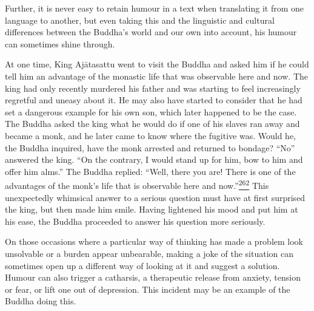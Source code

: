 Further, it is never easy to retain humour in a text when translating it
from one language to another, but even taking this and the linguistic
and cultural differences between the Buddha's world and our own into
account, his humour can sometimes shine through.

At one time, King Ajātasattu went to visit the Buddha and asked him if
he could tell him an advantage of the monastic life that was observable
here and now. The king had only recently murdered his father and was
starting to feel increasingly regretful and uneasy about it. He may also
have started to consider that he had set a dangerous example for his own
son, which later happened to be the case. The Buddha asked the king what
he would do if one of his slaves ran away and became a monk, and he
later came to know where the fugitive was. Would he, the Buddha
inquired, have the monk arrested and returned to bondage? ``No''
answered the king. ``On the contrary, I would stand up for him, bow to
him and offer him alms.'' The Buddha replied: ``Well, there you are!
There is one of the advantages of the monk's life that is observable
here and
now.''\label{footprints_split_010.html_fnref262}\hyperref[footprints_split_024.htmlux5cux23fn262]{\textsuperscript{262}}
This unexpectedly whimsical answer to a serious question must have at
first surprised the king, but then made him smile. Having lightened his
mood and put him at his ease, the Buddha proceeded to answer his
question more seriously.

On those occasions where a particular way of thinking has made a problem
look unsolvable or a burden appear unbearable, making a joke of the
situation can sometimes open up a different way of looking at it and
suggest a solution. Humour can also trigger a catharsis, a therapeutic
release from anxiety, tension or fear, or lift one out of depression.
This incident may be an example of the Buddha doing this.

